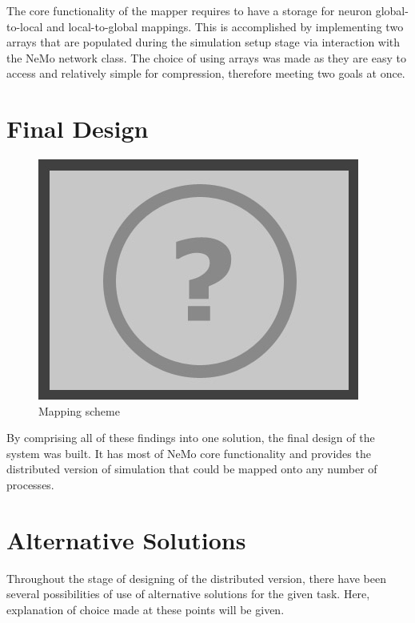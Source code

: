 The core functionality of the mapper requires to have a storage for neuron global-to-local and local-to-global mappings. This is accomplished by implementing two arrays that are populated during the simulation setup stage via interaction with the NeMo network class. The choice of using arrays was made as they are easy to access and relatively simple for compression, therefore meeting two goals at once.

\clearpage

\section{Final Design}

\begin{figure}[h]
\begin{center}
\includegraphics[scale = 1]{images/placeholder.png}
\end{center}
\caption{Mapping scheme}
\end{figure}

By comprising all of these findings into one solution, the final design of the system was built. It has most of NeMo core functionality and provides the distributed version of simulation that could be mapped onto any number of processes.

\section{Alternative Solutions}

Throughout the stage of designing of the distributed version, there have been several possibilities of use of alternative solutions for the given task. Here, explanation of choice made at these points will be given.

